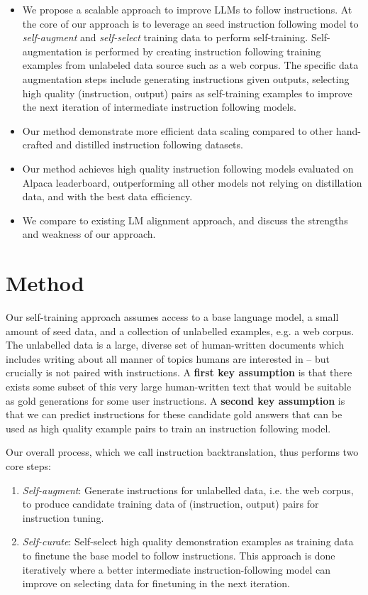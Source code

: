 \begin{itemize}
\item We propose a scalable approach to improve LLMs to follow instructions. At the core of our approach is to leverage an seed instruction following model to \textit{self-augment} and \textit{self-select} training data to perform self-training. Self-augmentation is performed by creating instruction following training examples from unlabeled data source such as a web corpus. The specific data augmentation steps include generating instructions given outputs, selecting high quality (instruction, output) pairs as self-training examples to improve the next iteration of intermediate instruction following models.

\item Our method demonstrate more efficient data scaling compared to other hand-crafted and distilled instruction following datasets.

\item Our method achieves high quality instruction following models evaluated on Alpaca leaderboard, outperforming all other models not relying on distillation data, and with the best data efficiency. 

\item We compare to existing LM alignment approach, and discuss the strengths and weakness of our approach.
\end{itemize}
\fi \section{Method}
\label{methods}

Our self-training approach assumes access to a base language model, a small amount of seed data, and a collection of unlabelled examples, e.g. a web corpus. The unlabelled data is a large, diverse set of human-written documents which includes writing about all manner of topics humans are interested in -- but crucially is not paired with instructions. 
A \textbf{first key assumption} is that there exists some subset of this very large human-written text that would be suitable as gold generations for some user instructions.
A \textbf{second key assumption} is that we can predict  instructions for these candidate gold answers that can be used as high quality example pairs to train an instruction following model.

Our overall process,  which we call instruction backtranslation, 
 thus performs two core steps: 
\begin{enumerate}[leftmargin=*]
    \item {\em Self-augment}: Generate instructions for unlabelled data, i.e. the web corpus, to produce candidate training data of (instruction, output) pairs for instruction tuning. 
    \item {\em Self-curate}: Self-select high quality demonstration examples as training data to finetune the base model to follow instructions. This approach is done iteratively where a better intermediate instruction-following model can improve on selecting data for finetuning in the next iteration.
\end{enumerate}

